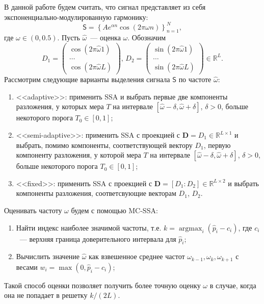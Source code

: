 \documentclass{math-mech-sci}
\begin{document}
В данной работе будем считать, что сигнал представляет из себя экспоненциально-модулированную гармонику:
$$
\mathsf{S}=\left\{Ae^{\alpha n}\cos(2\pi\omega n)\right\}_{n=1}^N,
$$
где $\omega\in(0, 0.5)$. Пусть $\hat\omega$~--- оценка $\omega$. Обозначим
$$
D_1=\begin{pmatrix}
    \cos(2\pi\hat\omega 1)\\
    \ldots\\
    \cos(2\pi\hat\omega L)
    \end{pmatrix}, \,
D_2=\begin{pmatrix}
    \sin(2\pi\hat\omega 1)\\
    \ldots\\
    \sin(2\pi\hat\omega L)
\end{pmatrix}\in \mathbb{R}^L.
$$
Рассмотрим следующие варианты выделения сигнала $\mathsf{S}$ по частоте $\hat \omega$:
\begin{enumerate}
    \item <<adaptive>>: применить SSA и выбрать первые две компоненты разложения, у которых мера $T$ на интервале $[\hat\omega-\delta, \hat\omega+\delta]$, $\delta>0$, больше некоторого порога $T_0\in[0, 1]$;
    \item  <<semi-adaptive>>: применить SSA с проекцией с $\mathbf{D}=D_1\in \mathbb{R}^{L\times 1}$ и выбрать, помимо компоненты, соответствующей вектору $D_1$, первую компоненту разложения, у которой мера $T$ на интервале $[\hat\omega-\delta, \hat\omega+\delta]$, $\delta>0$, больше некоторого порога $T_0\in[0, 1]$;
    \item <<fixed>>: применить SSA с проекцией с $\mathbf{D}=[D_1:D_2]\in\mathbb{R}^{L\times 2}$ и выбрать компоненты разложения, соответсвующие векторам $D_1$, $D_2$.
\end{enumerate}
Оценивать частоту $\omega$ будем с помощью MC-SSA:
\begin{enumerate}
    \item Найти индекс наиболее значимой частоты, т.е. $k=\operatorname{argmax}_i(\widehat{p}_i-c_i)$, где $c_i$~--- верхняя граница доверительного интервала для $\widehat{p}_i$;
    \item Вычислить значение $\hat\omega$ как взвешенное среднее частот $\omega_{k-1}, \omega_k,\omega_{k+1}$ с весами $w_i=\max(0, \widehat{p}_i-c_i)$;
\end{enumerate}
Такой способ оценки позволяет получить более точную оценку $\omega$ в случае, когда она не попадает в решетку $k/(2L)$.
\end{document}
